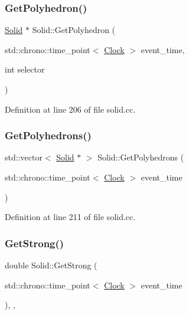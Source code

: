 \subsubsection{\texorpdfstring{Get\+Polyhedron()}{GetPolyhedron()}}
{\footnotesize\ttfamily \mbox{\hyperlink{class_solid}{Solid}} $\ast$ Solid\+::\+Get\+Polyhedron (\begin{DoxyParamCaption}\item[{std\+::chrono\+::time\+\_\+point$<$ \mbox{\hyperlink{universe_8h_a0ef8d951d1ca5ab3cfaf7ab4c7a6fd80}{Clock}} $>$}]{event\+\_\+time,  }\item[{int}]{selector }\end{DoxyParamCaption})}



Definition at line 206 of file solid.\+cc.

\mbox{\label{class_solid_a7006714c19bf8a7b020f42f394e4edc0}} 
\subsubsection{\texorpdfstring{Get\+Polyhedrons()}{GetPolyhedrons()}}
{\footnotesize\ttfamily std\+::vector$<$ \mbox{\hyperlink{class_solid}{Solid}} $\ast$ $>$ Solid\+::\+Get\+Polyhedrons (\begin{DoxyParamCaption}\item[{std\+::chrono\+::time\+\_\+point$<$ \mbox{\hyperlink{universe_8h_a0ef8d951d1ca5ab3cfaf7ab4c7a6fd80}{Clock}} $>$}]{event\+\_\+time }\end{DoxyParamCaption})}



Definition at line 211 of file solid.\+cc.

\mbox{\label{class_solid_ae39d0166456b8feaa39547e5a21c9096}} 
\subsubsection{\texorpdfstring{Get\+Strong()}{GetStrong()}}
{\footnotesize\ttfamily double Solid\+::\+Get\+Strong (\begin{DoxyParamCaption}\item[{std\+::chrono\+::time\+\_\+point$<$ \mbox{\hyperlink{universe_8h_a0ef8d951d1ca5ab3cfaf7ab4c7a6fd80}{Clock}} $>$}]{event\+\_\+time }\end{DoxyParamCaption})\hspace{0.3cm}{\ttfamily [inline]}, {\ttfamily [final]}, {\ttfamily [virtual]}}



